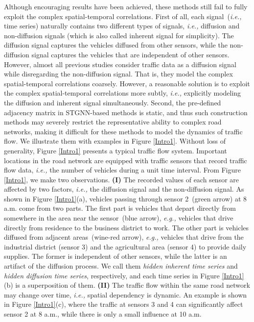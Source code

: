 \documentclass[sigconf, nonacm]{acmart}
\newcommand{\eg}{\textit{e.g.,}\xspace}
\newcommand{\ie}{\textit{i.e.,}\xspace}
\begin{document}
{Although encouraging results have been achieved, these methods still fail to fully exploit the complex spatial-temporal correlations. 
First of all, each signal~(\ie time series) naturally contains two different types of signals, \ie diffusion and non-diffusion signals (which is also called inherent signal for simplicity).
The diffusion signal captures the vehicles diffused from other sensors, while the non-diffusion signal captures the vehicles that are independent of other sensors.
However, almost all previous studies consider traffic data as a diffusion signal while disregarding the non-diffusion signal.
That is, they model the complex spatial-temporal correlations coarsely.
However, a reasonable solution is to exploit the complex spatial-temporal correlations more subtly,
\ie explicitly modeling the diffusion and inherent signal simultaneously.
Second, the pre-defined adjacency matrix in STGNN-based methods is static, and thus such construction methods may severely restrict the representative ability to complex road networks, making it difficult for these methods to model the dynamics of traffic flow.
We illustrate them with examples in Figure \ref{Intro1}. 
Without loss of generality, Figure \ref{Intro1} presents a typical traffic flow system.
Important locations in the road network are equipped with traffic sensors that record traffic flow data, \ie the number of vehicles during a unit time interval.
From Figure \ref{Intro1}, we make two observations.
\textbf{(I)} The recorded values of each sensor are affected by two factors, \ie the diffusion signal and the non-diffusion signal.
As shown in Figure \ref{Intro1}(a), vehicles passing through sensor 2~(green arrow) at 8 a.m. come from two parts.
The first part is vehicles that depart directly from somewhere in the area near the sensor~(blue arrow), \eg vehicles that drive directly from residence to the business district to work.
The other part is vehicles diffused from adjacent areas~(wine-red arrow), \eg vehicles that drive from the industrial district (sensor 3) and the agricultural area (sensor 4) to provide daily supplies.
The former is independent of other sensors, while the latter is an artifact of the diffusion process.
We call them \textit{hidden inherent time series} and \textit{hidden diffusion time series}, respectively, and each time series in Figure \ref{Intro1}(b) is a superposition of them.
\textbf{(II)} The traffic flow within the same road network may change over time, \ie spatial dependency is dynamic. 
An example is shown in Figure \ref{Intro1}(c), where the traffic at sensors 3 and 4 can significantly affect sensor 2 at 8 a.m., while there is only a small influence at 10 a.m. 

}
\end{document}
